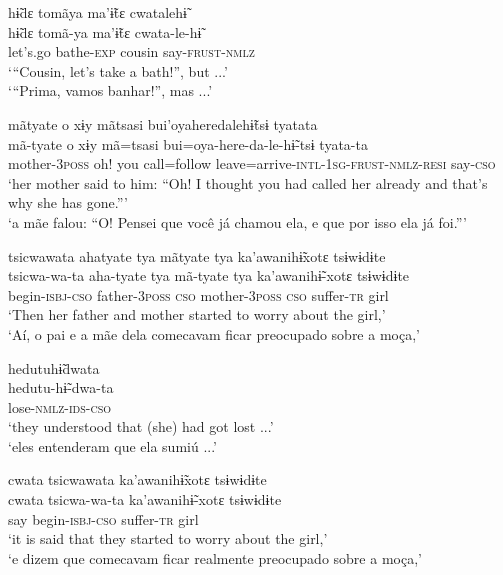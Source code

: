 \documentclass[output=paper,
modfonts,nonflat
]{langsci/langscibook}
\begin{document}
\newpage 
\ea hɨ̃dɛ tomãya ma'ɨ̃tɛ cwatalehɨ̃\\[.3em]
\gll hɨ̃dɛ		tomã-ya	ma'ɨ̃tɛ		cwata-le-hɨ̃{\footnotemark}\\
let’s.go	bathe-\textsc{exp}	cousin 	say-\textsc{frust-nmlz}\\
\glt ‘“Cousin, let’s take a bath!”, but ...’\\
‘“Prima, vamos banhar!”, mas ...'
\z

\ea mãtyate o xɨy mãtsasi bui'oyaheredalehɨ̃tsɨ tyatata\\[.3em]
\gll mã-tyate		o	xɨy		mã=tsasi		bui=oya-here-da-le-hɨ̃-tsɨ					tyata-ta\\
mother-\textsc{3poss}	oh!	you	call=follow	leave=arrive-\textsc{intl-1sg-frust-nmlz-resi}	say-\textsc{cso}\\
\glt ‘her mother said to him: “Oh! I thought you had called her already and that’s why she has gone.”'\\
‘a mãe falou: “O! Pensei que você já chamou ela, e que por isso ela já foi.”'
\z

\ea tsicwawata ahatyate tya mãtyate tya ka'awanihɨ̃xotɛ tsɨwɨdɨte\\[.3em]
\gll tsicwa-wa-ta	aha-tyate		tya		mã-tyate		tya		ka'awanihɨ̃-xotɛ	tsɨwɨdɨte\\
begin-\textsc{isbj-cso}	father-\textsc{3poss}	\textsc{cso}	mother-\textsc{3poss}	\textsc{cso}	suffer-\textsc{tr}		girl\\
\glt ‘Then her father and mother started to worry about the girl,’\\
‘Aí, o pai e a mãe dela comecavam ficar preocupado sobre a moça,'
\z

\ea hedutuhɨ̃dwata\\[.3em] 
\gll hedutu-hɨ̃-dwa-ta\\
lose-\textsc{nmlz-ids-cso}\\
\glt ‘they understood that (she) had got lost ...'\\
‘eles entenderam que ela sumiú ...'
\z
 
\ea cwata tsicwawata ka'awanihɨ̃xotɛ tsɨwɨdɨte\\[.3em] 
\gll cwata tsicwa-wa-ta	ka'awanihɨ̃-xotɛ	tsɨwɨdɨte\\
say		begin-\textsc{isbj-cso}	suffer-\textsc{tr}		girl\\
\glt ‘it is said that they started to worry about the girl,’\\
‘e dizem que comecavam ficar realmente preocupado sobre a moça,'
\z
\end{document}
